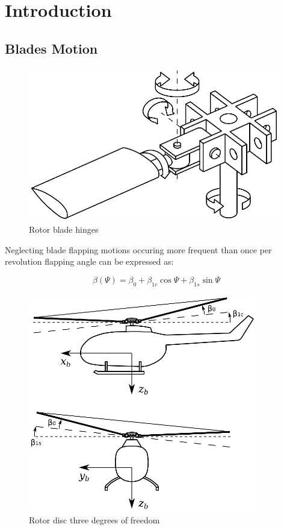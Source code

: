 \chapter{Introduction}

\section{Blades Motion}

\begin{figure}[h!]
  \centering
  \includegraphics[width=110mm]{eps/rotor_hub_hinges.eps}
  \caption{Rotor blade hinges}
\end{figure}

Neglecting blade flapping motions occuring more frequent than once per revolution flapping angle can be expressed as:

\begin{equation}
\beta \left( \Psi \right)
=
\beta_0 + \beta_{1c} \cos \Psi + \beta_{1s} \sin \Psi 
\end{equation}

\begin{figure}[h!]
  \centering
  \includegraphics[width=100mm]{eps/rotor_flapping_angles.eps}
  \caption{Rotor disc three degrees of freedom}
\end{figure}
